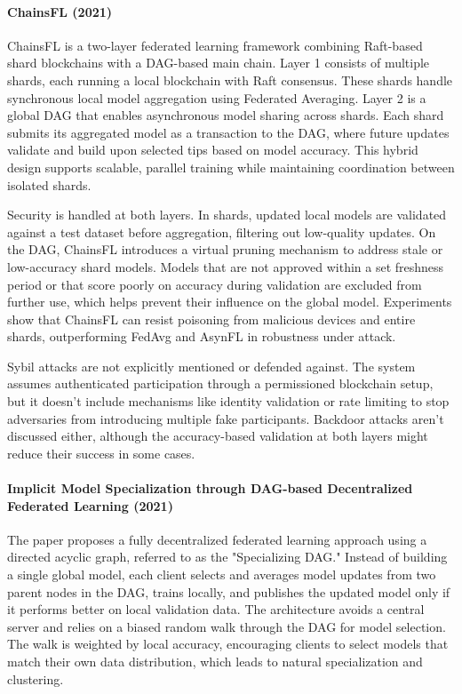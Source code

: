 \newpage
\paragraph{ChainsFL (2021)} \cite{yuan_chainsfl_2021}
ChainsFL is a two-layer federated learning framework combining Raft-based shard blockchains with a DAG-based main chain. Layer 1 consists of multiple shards, each running a local blockchain with Raft consensus. These shards handle synchronous local model aggregation using Federated Averaging. Layer 2 is a global DAG that enables asynchronous model sharing across shards. Each shard submits its aggregated model as a transaction to the DAG, where future updates validate and build upon selected tips based on model accuracy. This hybrid design supports scalable, parallel training while maintaining coordination between isolated shards.

Security is handled at both layers. In shards, updated local models are validated against a test dataset before aggregation, filtering out low-quality updates. On the DAG, ChainsFL introduces a virtual pruning mechanism to address stale or low-accuracy shard models. Models that are not approved within a set freshness period or that score poorly on accuracy during validation are excluded from further use, which helps prevent their influence on the global model. Experiments show that ChainsFL can resist poisoning from malicious devices and entire shards, outperforming FedAvg and AsynFL in robustness under attack.

Sybil attacks are not explicitly mentioned or defended against. The system assumes authenticated participation through a permissioned blockchain setup, but it doesn’t include mechanisms like identity validation or rate limiting to stop adversaries from introducing multiple fake participants. Backdoor attacks aren’t discussed either, although the accuracy-based validation at both layers might reduce their success in some cases.

\newpage
\paragraph{Implicit Model Specialization through DAG-based Decentralized Federated Learning (2021)} \cite{beilharz_implicit_2021}
The paper proposes a fully decentralized federated learning approach using a directed acyclic graph, referred to as the "Specializing DAG." Instead of building a single global model, each client selects and averages model updates from two parent nodes in the DAG, trains locally, and publishes the updated model only if it performs better on local validation data. The architecture avoids a central server and relies on a biased random walk through the DAG for model selection. The walk is weighted by local accuracy, encouraging clients to select models that match their own data distribution, which leads to natural specialization and clustering.

